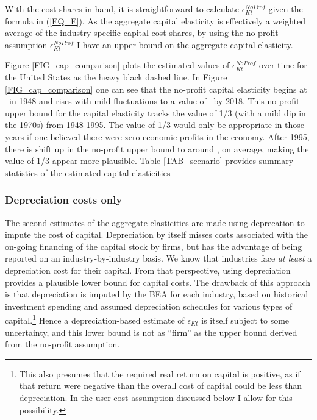 \documentclass[11pt]{article}
\begin{document}
With the cost shares in hand, it is straightforward to calculate $\epsilon_{Kt}^{NoProf}$ given the formula in (\ref{EQ_E}). As the aggregate capital elasticity is effectively a weighted average of the industry-specific capital cost shares, by using the no-profit assumption $\epsilon_{Kt}^{NoProf}$ I have an upper bound on the aggregate capital elasticity.

Figure \ref{FIG_cap_comparison} plots the estimated values of $\epsilon_{Kt}^{NoProf}$ over time for the United States as the heavy black dashed line. In Figure \ref{FIG_cap_comparison} one can see that the no-profit capital elasticity begins at \basefirstnoprofit \ in 1948 and rises with mild fluctuations to a value of \baselastnoprofit \ by 2018. This no-profit upper bound for the capital elasticity tracks the value of 1/3 (with a mild dip in the 1970s) from 1948-1995. The value of 1/3 would only be appropriate in those years if one believed there were zero economic profits in the economy. After 1995, there is shift up in the no-profit upper bound to around \baselatenoprofit, on average, making the value of 1/3 appear more plausible. Table \ref{TAB_scenario} provides summary statistics of the estimated capital elasticities

\subsubsection{Depreciation costs only}
The second estimates of the aggregate elasticities are made using deprecation to impute the cost of capital. Depreciation by itself misses costs associated with the on-going financing of the capital stock by firms, but has the advantage of being reported on an industry-by-industry basis. We know that industries face \textit{at least} a depreciation cost for their capital. From that perspective, using depreciation provides a plausible lower bound for capital costs. The drawback of this approach is that depreciation is imputed by the BEA for each industry, based on historical investment spending and assumed depreciation schedules for various types of capital.\footnote{This also presumes that the required real return on capital is positive, as if that return were negative than the overall cost of capital could be less than depreciation. In the user cost assumption discussed below I allow for this possibility.} Hence a depreciation-based estimate of $\epsilon_{Kt}$ is itself subject to some uncertainty, and this lower bound is not as ``firm'' as the upper bound derived from the no-profit assumption. 
\end{document}
